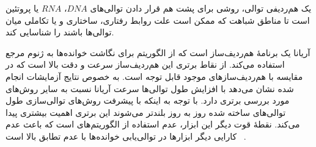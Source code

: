 
یک هم‌ردیفی توالی، روشی برای پشت هم قرار دادن توالی‌های $DNA$، $RNA$ یا پروتئین است تا مناطق شباهت که ممکن است علت روابط رفتاری، ساختاری و یا تکاملی میان توالی‌ها باشند را شناسایی کند.



آریانا یک برنامهٔ هم‌ردیف‌ساز است که از الگوریتم  برای نگاشت خوانده‌ها به ژنوم مرجع استفاده می‌کند. از نقاط برتری این هم‌ردیف‌ساز سرعت و دقت بالا است که در مقایسه با هم‌ردیف‌سازهای موجود قابل توجه است. به خصوص نتایج آزمایشات انجام شده نشان می‌دهد با افزایش طول توالی‌ها سرعت آریانا نسبت به سایر روش‌های مورد بررسی برتری دارد. با توجه به اینکه با پیشرفت روش‌های توالی‌سازی طول توالی‌های ساخته شده روز به روز بلندتر می‌شوند این برتری اهمیت بیشتری پیدا می‌کند. نقطهٔ قوت دیگر این ابزار، عدم استفاده از الگوریتم‌های  است که باعث عدم کارایی دیگر ابزارها در توالی‌یابی خوانده‌ها با عدم تطابق بالا است
~\cite{gholami2014aryana}.




